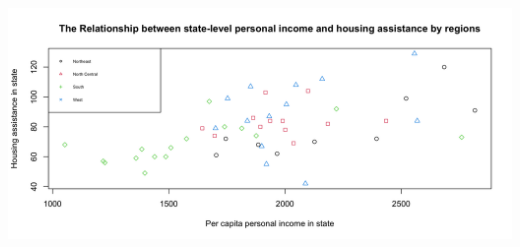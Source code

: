 \documentclass[12pt,letterpaper]{article}
\begin{document}
\begin{itemize}
\vspace{.2cm}
  
\vspace{.2cm} 

\vspace{.2cm}
\includegraphics[width=\textwidth]{Babaian-plot4.png}
\vspace{.2cm}

\end{itemize}
\end{document}
